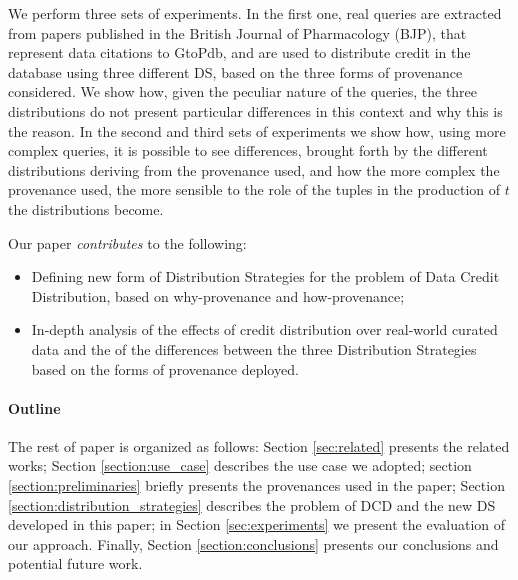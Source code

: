 We perform three sets of experiments. In the first one, real queries are extracted from papers published in the British Journal of Pharmacology (BJP), that represent data citations to GtoPdb, and are used to distribute credit in the database using three different DS, based on the three forms of provenance considered. 
We show how, given the peculiar nature of the queries, the three distributions do not present particular differences in this context and why this is the reason. 
In the second and third sets of experiments we show how, using more complex queries, it is possible to see differences, brought forth by the different distributions deriving from the provenance used, and how the more complex the provenance used, the more sensible to the role of the tuples in the production of $t$ the distributions become.


Our paper \emph{contributes} to the following:
\begin{itemize}
    \item Defining new form of Distribution Strategies for the problem of Data Credit Distribution, based on why-provenance and how-provenance;
    \item In-depth analysis of the effects of credit distribution over real-world curated data and the of the differences between the three Distribution Strategies based on the forms of provenance deployed.
\end{itemize}

\paragraph{\textbf{Outline}} The rest of paper is organized as follows:
Section \ref{sec:related} presents the related works; Section \ref{section:use_case} describes the use case we adopted; section \ref{section:preliminaries} briefly presents the provenances used in the paper; Section \ref{section:distribution_strategies} describes the problem of DCD and the new DS developed in this paper; in Section \ref{sec:experiments} we present the evaluation of our approach. Finally, Section \ref{section:conclusions} presents our conclusions and potential future work.



 
